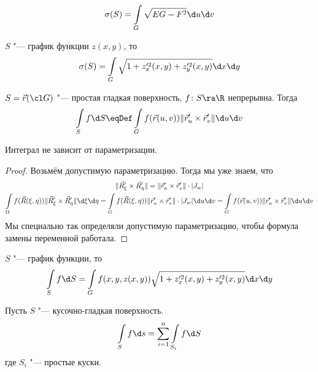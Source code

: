 \begin{conseq}
	\[
		\sigma(S) = \int\limits_G \sqrt{EG - F^2} \d u \d v
	\]
\end{conseq}

\begin{conseq}
	$S$ "--- график функции $z(x, y)$, то
	\[
		\sigma(S) = \int\limits_G \sqrt{1 + z_x'^2(x, y) + z_y'^2(x, y)} \d x \d y
	\]
\end{conseq}

\begin{Def}
	$S = \vec r(\cl G)$ "--- простая гладкая поверхность, $f\colon S \ra \R$ непрерывна.
	Тогда
	\[
		\int\limits_S f \d S \eqDef \int\limits_G f(\vec r(u, v)) \| \vec r_u' \times \vec r_v' \| \d u \d v
	\]
\end{Def}

\begin{theorem}
	Интеграл не зависит от параметризации.
\end{theorem}
\begin{proof}
	Возьмём допустимую параметризацию. Тогда мы уже знаем, что
	\begin{gather*}
		\|\vec R_\xi' \times \vec R_\eta'\| = \|\vec r_u' \times \vec r_v'\| \cdot |J_w| \\
		\int\limits_\Omega f(\vec R(\xi, \eta)) \| \vec R_\xi' \times \vec R_\eta' \| \d\xi \d \eta
		= \int\limits_G f(\vec R(\xi, \eta)) \|\vec r_u' \times \vec r_v'\| \cdot |J_w| \d u \d v
		= \int\limits_G f(\vec r(u, v)) \| \vec r_u' \times \vec r_v' \| \d u \d v
	\end{gather*}
	Мы специально так определяли допустимую параметризацию, чтобы формула замены переменной работала.
\end{proof}

\begin{Rem}
	$S$ "--- график функции, то
	\[ \int\limits_S f \d S = \int\limits_G f(x, y, z(x, y)) \sqrt{1 + z_x'^2(x, y) + z_y'^2(x, y)} \d x \d y \]
\end{Rem}

\begin{Def}
	Пусть $S$ "--- кусочно-гладкая поверхность.
	\[ \int\limits_S f \d s = \sum_{i=1}^n \int\limits_{S_i} f \d S \]
	где $S_i$ "--- простые куски.
\end{Def}
